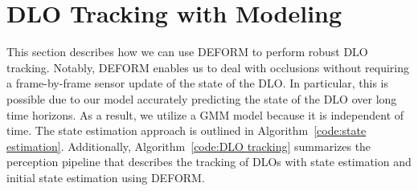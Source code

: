 \section{DLO Tracking with Modeling}
\label{sec:tracking}

This section describes how we can use DEFORM to perform robust DLO tracking.
Notably, DEFORM enables us to deal with occlusions without requiring a frame-by-frame sensor update of the state of the DLO. 
In particular, this is possible due to our model accurately predicting the state of the DLO over long time horizons. 
As a result, we utilize a GMM model because it is independent of time. 
The state estimation approach is outlined in Algorithm~\ref{code:state estimation}. 
Additionally, Algorithm~\ref{code:DLO tracking} summarizes the perception pipeline that describes the tracking of DLOs with state estimation and initial state estimation using DEFORM.

